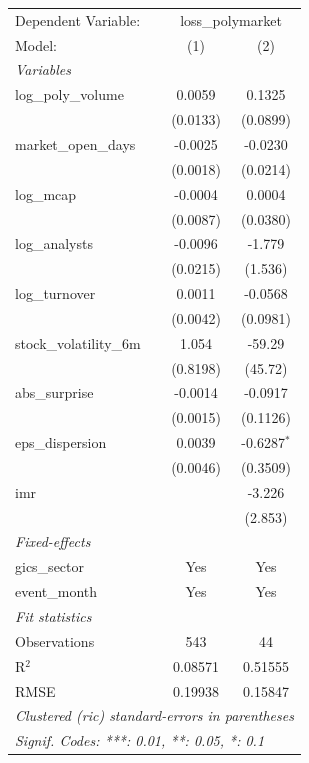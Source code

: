 \begingroup
\centering
\begin{tabular}{lcc}
   \tabularnewline \midrule \midrule
   Dependent Variable: & \multicolumn{2}{c}{loss\_polymarket}\\
   Model:                  & (1)      & (2)\\  
   \midrule
   \emph{Variables}\\
   log\_poly\_volume       & 0.0059   & 0.1325\\   
                           & (0.0133) & (0.0899)\\   
   market\_open\_days      & -0.0025  & -0.0230\\   
                           & (0.0018) & (0.0214)\\   
   log\_mcap               & -0.0004  & 0.0004\\   
                           & (0.0087) & (0.0380)\\   
   log\_analysts           & -0.0096  & -1.779\\   
                           & (0.0215) & (1.536)\\   
   log\_turnover           & 0.0011   & -0.0568\\   
                           & (0.0042) & (0.0981)\\   
   stock\_volatility\_6m   & 1.054    & -59.29\\   
                           & (0.8198) & (45.72)\\   
   abs\_surprise           & -0.0014  & -0.0917\\   
                           & (0.0015) & (0.1126)\\   
   eps\_dispersion         & 0.0039   & -0.6287$^{*}$\\   
                           & (0.0046) & (0.3509)\\   
   imr                     &          & -3.226\\   
                           &          & (2.853)\\   
   \midrule
   \emph{Fixed-effects}\\
   gics\_sector            & Yes      & Yes\\  
   event\_month            & Yes      & Yes\\  
   \midrule
   \emph{Fit statistics}\\
   Observations            & 543      & 44\\  
   R$^2$                   & 0.08571  & 0.51555\\  
   RMSE                    & 0.19938  & 0.15847\\  
   \midrule \midrule
   \multicolumn{3}{l}{\emph{Clustered (ric) standard-errors in parentheses}}\\
   \multicolumn{3}{l}{\emph{Signif. Codes: ***: 0.01, **: 0.05, *: 0.1}}\\
\end{tabular}
\par\endgroup
